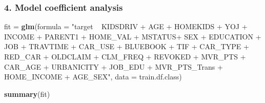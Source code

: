 \documentclass[]{article}
\newenvironment{Shaded}{\begin{snugshade}}{\end{snugshade}}
\newcommand{\DataTypeTok}[1]{\textcolor[rgb]{0.13,0.29,0.53}{#1}}
\newcommand{\KeywordTok}[1]{\textcolor[rgb]{0.13,0.29,0.53}{\textbf{#1}}}
\newcommand{\NormalTok}[1]{#1}
\newcommand{\StringTok}[1]{\textcolor[rgb]{0.31,0.60,0.02}{#1}}
\begin{document}
\hypertarget{model-coefficient-analysis}{%
\subsubsection{\texorpdfstring{\textbf{4. Model coefficient
analysis}}{4. Model coefficient analysis}}\label{model-coefficient-analysis}}

\begin{Shaded}
\begin{Highlighting}[]
\NormalTok{fit =}\StringTok{ }\KeywordTok{glm}\NormalTok{(}\DataTypeTok{formula =} \StringTok{"target ~ KIDSDRIV + AGE + HOMEKIDS + YOJ + INCOME + PARENT1 + HOME_VAL + MSTATUS+ SEX + EDUCATION + JOB + TRAVTIME + CAR_USE + BLUEBOOK  + TIF + CAR_TYPE + RED_CAR + OLDCLAIM + CLM_FREQ + REVOKED + MVR_PTS + CAR_AGE + URBANICITY + JOB_EDU + MVR_PTS_Trans + HOME_INCOME + AGE_SEX"}\NormalTok{, }\DataTypeTok{data =}\NormalTok{ train.df.class)}

\KeywordTok{summary}\NormalTok{(fit)}
\end{Highlighting}
\end{Shaded}
\end{document}
